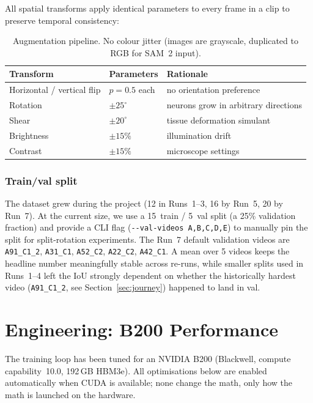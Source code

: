 \documentclass[11pt,a4paper]{article}
\begin{document}
All spatial transforms apply identical parameters to every frame in a
clip to preserve temporal consistency:

\begin{table}[ht!]
\centering
\small
\begin{tabular}{lll}
\toprule
Transform & Parameters & Rationale \\
\midrule
Horizontal / vertical flip & $p=0.5$ each & no orientation preference \\
Rotation                    & $\pm 25^\circ$ & neurons grow in arbitrary directions \\
Shear                       & $\pm 20^\circ$ & tissue deformation simulant \\
Brightness                  & $\pm 15\%$ & illumination drift \\
Contrast                    & $\pm 15\%$ & microscope settings \\
\bottomrule
\end{tabular}
\caption{Augmentation pipeline. No colour jitter (images are grayscale,
duplicated to RGB for SAM~2 input).}
\end{table}

\subsubsection{Train/val split}

The dataset grew during the project (12 in Runs~1--3, 16 by Run~5,
20 by Run~7). At the current size, we use a 15~train / 5~val split
(a 25\% validation fraction) and provide a CLI flag
(\texttt{-{}-val-videos A,B,C,D,E}) to manually pin the split for
split-rotation experiments. The Run~7 default validation videos are
\texttt{A91\_C1\_2}, \texttt{A31\_C1}, \texttt{A52\_C2},
\texttt{A22\_C2}, \texttt{A42\_C1}. A mean over 5 videos keeps the
headline number meaningfully stable across re-runs, while smaller
splits used in Runs~1--4 left the IoU strongly dependent on whether
the historically hardest video (\texttt{A91\_C1\_2}, see
Section~\ref{sec:journey}) happened to land in val.

\section{Engineering: B200 Performance}

The training loop has been tuned for an NVIDIA B200 (Blackwell, compute
capability~10.0, 192\,GB HBM3e). All optimisations below are enabled
automatically when CUDA is available; none change the math, only how
the math is launched on the hardware.
\end{document}
